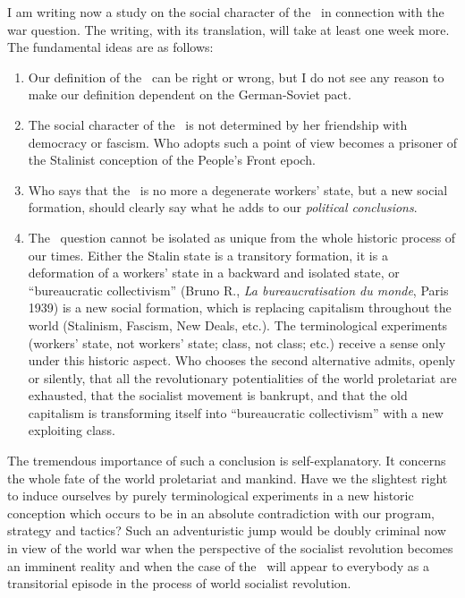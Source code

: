 


\noindent
I am writing
now a study on the social character of the \USSR\ in connection with the war question. The writing, with its translation, will take at least one week more. The fundamental ideas are as follows:

\begin{enumerate}
	\item Our definition of the \USSR\ can be right or wrong, but I do not see any reason to make our definition dependent on the German-Soviet pact.
	
	\item The social character of the \USSR\ is not determined by her friendship with democracy or fascism. Who adopts such a point of view becomes a prisoner of the Stalinist conception of the People’s Front epoch.
	
	\item Who says that the \USSR\ is no more a degenerate workers’ state, but a new social formation, should clearly say what he adds to our \emph{political conclusions}.
	
	\item The \USSR\ question cannot be isolated as unique from the whole historic process of our times. Either the Stalin state is a transitory formation, it is a deformation of a workers’ state in a backward and isolated state, or “bureaucratic collectivism” (Bruno R., \emph{La bureaucratisation du monde}, Paris 1939) is a new social formation, which is replacing capitalism throughout the world (Stalinism, Fascism, New Deals, etc.). The terminological experiments (workers’ state, not workers’ state; class, not class; etc.) receive a sense only under this historic aspect. Who chooses the second alternative admits, openly or silently, that all the revolutionary potentialities of the world proletariat are exhausted, that the socialist movement is bankrupt, and that the old capitalism is transforming itself into “bureaucratic collectivism” with a new exploiting class.
\end{enumerate}

The tremendous importance of such a conclusion is self-expla\-na\-tory. It concerns the whole fate of the world proletariat and man\-kind. Have we the slightest right to induce ourselves by purely terminological experiments in a new historic conception which occurs to be in an absolute contradiction with our program, strategy and tactics? Such an adventuristic jump would be doubly criminal now in view of the world war when the perspective of the socialist revolution becomes an imminent reality and when the case of the \USSR\ will appear to everybody as a transitorial episode in the process of world socialist revolution.

